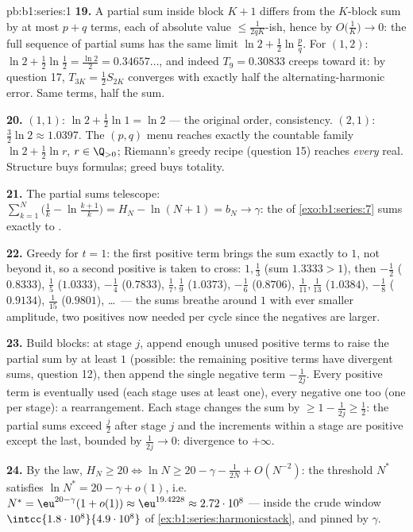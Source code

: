 \begin{solution}{pb:b1:series:1}
\textbf{19.} A partial sum inside block $K + 1$ differs from the
$K$-block sum by at most $p + q$ terms, each of absolute value
$\leq \frac{1}{2qK}$-ish, hence by $O\bigl(\frac1K\bigr) \to 0$:
the full sequence of partial sums has the same limit $\ln 2 +
\frac12\ln\frac pq$. For $(1, 2)$: $\ln 2 + \frac12\ln\frac12 =
\frac{\ln 2}{2} = 0.34657\dots$, and indeed $T_9 = 0.30833$
creeps toward it: by question 17, $T_{3K} = \frac12 S_{2K}$
converges with exactly half the alternating-harmonic error.
Same terms, half the sum.

\textbf{20.} $(1,1)$: $\ln 2 + \frac12\ln 1 = \ln 2$ --- the
original order, consistency. $(2,1)$: $\frac32\ln 2 \approx
1.0397$. The $(p,q)$ menu reaches exactly the countable 
family $\ln 2 + \frac12\ln r$, $r \in \Q_{>0}$; Riemann's greedy
recipe (question 15) reaches \emph{every} real. Structure buys
formulas; greed buys totality.

\textbf{21.} The partial sums telescope: $\sum_{k=1}^{N}
\bigl(\frac1k - \ln\frac{k+1}{k}\bigr) = H_N - \ln(N+1) = b_N
\to \gamma$: the  of \cref{exo:b1:series:7} sums exactly
to .

\textbf{22.} Greedy for $t = 1$: the first positive term brings
the sum exactly to $1$, not beyond it, so a second positive is
taken to cross: $1, \frac13$ (sum $1.3333 > 1$), then
$-\frac12$ ($0.8333$), $\frac15$ ($1.0333$), $-\frac14$
($0.7833$), $\frac17, \frac19$ ($1.0373$), $-\frac16$
($0.8706$), $\frac1{11}, \frac1{13}$ ($1.0384$), $-\frac18$
($0.9134$), $\frac1{15}$ ($0.9801$), \dots\ --- the sums breathe
around $1$ with ever smaller amplitude, two positives now
needed per cycle since the negatives are larger.

\textbf{23.} Build blocks: at stage $j$, append enough unused
positive terms to raise the partial sum by at least $1$
(possible: the remaining positive terms have divergent sums,
question 12), then append the single negative term $-\frac{1}
{2j}$. Every positive term is eventually used (each stage uses
at least one), every negative one too (one per stage): a
rearrangement. Each stage changes the sum by $\geq 1 -
\frac{1}{2j} \geq \frac12$: the partial sums exceed
$\frac{j}{2}$ after stage $j$ and the increments within a stage
are positive except the last, bounded by $\frac{1}{2j} \to 0$:
divergence to $+\infty$.

\textbf{24.} By the law, $H_N \geq 20 \iff \ln N \geq 20 -
\gamma - \frac{1}{2N} + O(N^{-2})$: the threshold $N^*$
satisfies $\ln N^* = 20 - \gamma + o(1)$, i.e.\ $N^* =
\eu^{20 - \gamma}(1 + o(1)) \approx \eu^{19.4228} \approx
2.72\cdot10^{8}$ --- inside the crude window
$\intcc{1.8\cdot10^8}{4.9\cdot10^8}$ of
\cref{ex:b1:series:harmonicstack}, and pinned by $\gamma$.


\end{solution}
